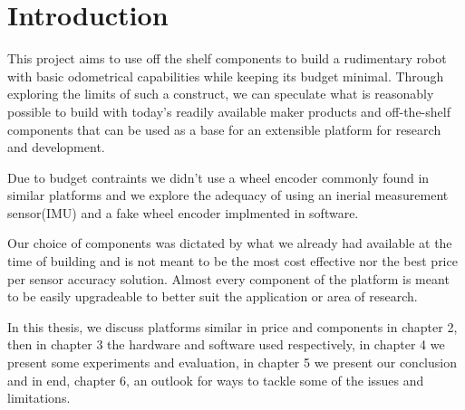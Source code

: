 \documentclass[class=report, crop=false]{standalone}
\begin{document}
\chapter{Introduction}\label{cha:introduction}
\pagestyle{scrheadings}
This project aims to use off the shelf components to build a rudimentary robot with basic odometrical capabilities while keeping its budget minimal. Through exploring the limits of such a construct, we can speculate what is reasonably possible to build with today's readily available maker products and off-the-shelf components that can be used as a base for an extensible platform for research and development.

Due to budget contraints we didn't use a wheel encoder commonly found in similar platforms and we explore the adequacy of using an inerial measurement sensor(IMU) and a fake wheel encoder implmented in software.

Our choice of components was dictated by what we already had available at the time of building and is not meant to be the most cost effective nor the best price per sensor accuracy solution. Almost every component of the platform is meant to be easily upgradeable to better suit the application or area of research.

In this thesis, we discuss platforms similar in price and components in chapter 2, then in chapter 3 the hardware and software used respectively, in chapter 4 we present some experiments and evaluation, in chapter 5 we present our conclusion and in end, chapter 6, an outlook for ways to tackle some of the issues and limitations.
\end{document}

